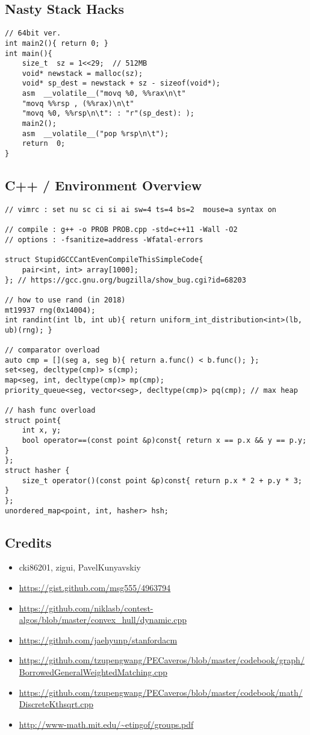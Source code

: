 \documentclass[landscape, 8pt, a4paper, oneside, twocolumn]{extarticle}
\begin{document}
\subsection {Nasty Stack Hacks}
\begin{verbatim}
// 64bit ver.
int main2(){ return 0; }
int main(){
	size_t  sz = 1<<29;  // 512MB
	void* newstack = malloc(sz);
	void* sp_dest = newstack + sz - sizeof(void*);
	asm  __volatile__("movq %0, %%rax\n\t"
	"movq %%rsp , (%%rax)\n\t"
	"movq %0, %%rsp\n\t": : "r"(sp_dest): );
	main2();
	asm  __volatile__("pop %rsp\n\t");
	return  0;
}
\end{verbatim}
\subsection {C++ / Environment Overview}
\begin{verbatim}
// vimrc : set nu sc ci si ai sw=4 ts=4 bs=2  mouse=a syntax on

// compile : g++ -o PROB PROB.cpp -std=c++11 -Wall -O2
// options : -fsanitize=address -Wfatal-errors

struct StupidGCCCantEvenCompileThisSimpleCode{
	pair<int, int> array[1000];
}; // https://gcc.gnu.org/bugzilla/show_bug.cgi?id=68203

// how to use rand (in 2018)
mt19937 rng(0x14004);
int randint(int lb, int ub){ return uniform_int_distribution<int>(lb, ub)(rng); }

// comparator overload
auto cmp = [](seg a, seg b){ return a.func() < b.func(); };
set<seg, decltype(cmp)> s(cmp);
map<seg, int, decltype(cmp)> mp(cmp);
priority_queue<seg, vector<seg>, decltype(cmp)> pq(cmp); // max heap

// hash func overload
struct point{
    int x, y;
    bool operator==(const point &p)const{ return x == p.x && y == p.y; }
};
struct hasher {
    size_t operator()(const point &p)const{ return p.x * 2 + p.y * 3; }
};
unordered_map<point, int, hasher> hsh;
\end{verbatim}
\subsection {Credits}
\begin{itemize}[noitemsep,nolistsep]
	\item cki86201, zigui, PavelKunyavskiy
	\item \url{https://gist.github.com/msg555/4963794}
	\item \url{https://github.com/niklasb/contest-algos/blob/master/convex_hull/dynamic.cpp}
	\item \url{https://github.com/jaehyunp/stanfordacm}
	\item \url{https://github.com/tzupengwang/PECaveros/blob/master/codebook/graph/BorrowedGeneralWeightedMatching.cpp}
	\item \url{https://github.com/tzupengwang/PECaveros/blob/master/codebook/math/DiscreteKthsqrt.cpp}
	\item \url{http://www-math.mit.edu/~etingof/groups.pdf}
\end{itemize}
\end{document}
